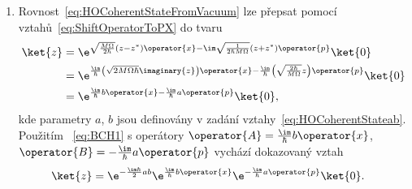 \begin{solution}
\begin{enumerate}
		\item
			Rovnost~\eqref{eq:HOCoherentStateFromVacuum} lze přepsat pomocí vztahů~\eqref{eq:ShiftOperatorToPX} do tvaru
			\begin{align}	
				\ket{z}
					&=\e^{\sqrt{\frac{M\Omega}{2\hbar}}\left(z-z^{*}\right)\operator{x}-
						\im\sqrt{\frac{1}{2\hbar M\Omega}}\left(z+z^{*}\right)\operator{p}}\ket{0}\nonumber\\
					&=\e^{\frac{\im}{\hbar}\left(\sqrt{2M\Omega\hbar}\imaginary{z}\right)\operator{x}-
						\frac{\im}{\hbar}\left(\sqrt{\frac{2\hbar}{M\Omega}}\real{z}\right)\operator{p}}\ket{0}\nonumber\\
					&=\e^{\frac{\im}{\hbar}b\operator{x}-\frac{\im}{\hbar}a\operator{p}}\ket{0},
			\end{align}
			kde parametry $a$, $b$ jsou definovány v zadání vztahy~\eqref{eq:HOCoherentStateab}.
			Použitím ~\eqref{eq:BCH1} s operátory $\operator{A}=\frac{\im}{\hbar}b\operator{x}$, $\operator{B}=-\frac{\im}{\hbar}a\operator{p}$ vychází dokazovaný vztah
			\begin{align}
				\ket{z}
					&=\e^{-\frac{\im\hbar}{2}ab}\e^{\frac{\im}{\hbar}b\operator{x}}\e^{-\frac{\im}{\hbar}a\operator{p}}\ket{0}.
			\end{align}
	\end{enumerate}
\end{solution}
